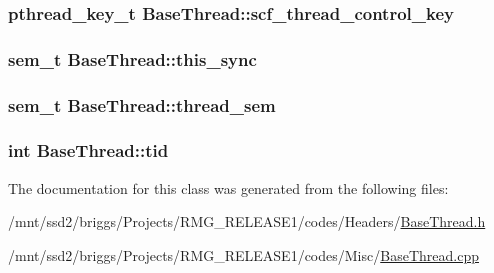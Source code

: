\hypertarget{class_base_thread_a2241451e1817682a1a1e14cf95c934d0}{
\subsubsection[{scf\-\_\-thread\-\_\-control\-\_\-key}]{\setlength{\rightskip}{0pt plus 5cm}pthread\-\_\-key\-\_\-t Base\-Thread\-::scf\-\_\-thread\-\_\-control\-\_\-key\hspace{0.3cm}{\ttfamily [static]}}}\label{class_base_thread_a2241451e1817682a1a1e14cf95c934d0}
\hypertarget{class_base_thread_accfa214a7f01edea97f022f60ac58ba9}{
\subsubsection[{this\-\_\-sync}]{\setlength{\rightskip}{0pt plus 5cm}sem\-\_\-t Base\-Thread\-::this\-\_\-sync}}\label{class_base_thread_accfa214a7f01edea97f022f60ac58ba9}
\hypertarget{class_base_thread_a05fa5117e2975d76a5c215e0cec0ff32}{
\subsubsection[{thread\-\_\-sem}]{\setlength{\rightskip}{0pt plus 5cm}sem\-\_\-t Base\-Thread\-::thread\-\_\-sem\hspace{0.3cm}{\ttfamily [static]}}}\label{class_base_thread_a05fa5117e2975d76a5c215e0cec0ff32}
\hypertarget{class_base_thread_a98cb2fa092cfd40fcdc3992096e58db8}{
\subsubsection[{tid}]{\setlength{\rightskip}{0pt plus 5cm}int Base\-Thread\-::tid}}\label{class_base_thread_a98cb2fa092cfd40fcdc3992096e58db8}


The documentation for this class was generated from the following files\-:\begin{DoxyCompactItemize}
\item 
/mnt/ssd2/briggs/\-Projects/\-R\-M\-G\-\_\-\-R\-E\-L\-E\-A\-S\-E1/codes/\-Headers/\hyperlink{_base_thread_8h}{Base\-Thread.\-h}\item 
/mnt/ssd2/briggs/\-Projects/\-R\-M\-G\-\_\-\-R\-E\-L\-E\-A\-S\-E1/codes/\-Misc/\hyperlink{_base_thread_8cpp}{Base\-Thread.\-cpp}\end{DoxyCompactItemize}
